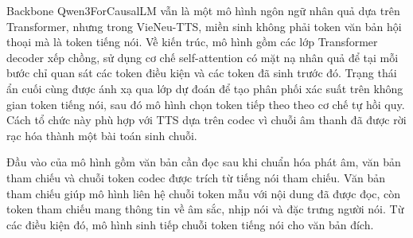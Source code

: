 \documentclass[a4paper,13pt,twoside]{report}
\begin{document}
Backbone Qwen3ForCausalLM vẫn là một mô hình ngôn ngữ nhân quả dựa trên Transformer, nhưng trong VieNeu-TTS, miền sinh không phải token văn bản hội thoại mà là token tiếng nói. Về kiến trúc, mô hình gồm các lớp Transformer decoder xếp chồng, sử dụng cơ chế self-attention có mặt nạ nhân quả để tại mỗi bước chỉ quan sát các token điều kiện và các token đã sinh trước đó. Trạng thái ẩn cuối cùng được ánh xạ qua lớp dự đoán để tạo phân phối xác suất trên không gian token tiếng nói, sau đó mô hình chọn token tiếp theo theo cơ chế tự hồi quy. Cách tổ chức này phù hợp với TTS dựa trên codec vì chuỗi âm thanh đã được rời rạc hóa thành một bài toán sinh chuỗi.

Đầu vào của mô hình gồm văn bản cần đọc sau khi chuẩn hóa phát âm, văn bản tham chiếu và chuỗi token codec được trích từ tiếng nói tham chiếu. Văn bản tham chiếu giúp mô hình liên hệ chuỗi token mẫu với nội dung đã được đọc, còn token tham chiếu mang thông tin về âm sắc, nhịp nói và đặc trưng người nói. Từ các điều kiện đó, mô hình sinh tiếp chuỗi token tiếng nói cho văn bản đích.
\end{document}
